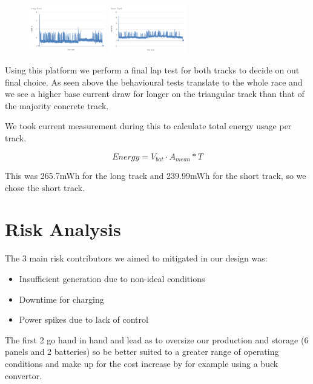\documentclass[11pt]{article}
\begin{document}
\begin{figure}[h!]
    \begin{center}
        \includegraphics[width=0.3\textwidth]{inc/long_lap.png}
        \includegraphics[width=0.3\textwidth]{inc/short_lap.png}
    \end{center}
\end{figure}

Using this platform we perform a final lap test for both tracks to decide on out final choice. As seen above the behavioural tests translate to the whole race and we see a higher base current draw for longer on the triangular track than that of the majority concrete track.

We took current measurement during this to calculate total energy usage per track.

$$Energy = V_{bat}{\cdot}A_{mean}*T$$

This was 265.7mWh for the long track and 239.99mWh for the short track, so we chose the short track.

\newpage
\section{Risk Analysis}
The 3 main risk contributors we aimed to mitigated in our design was:
\begin{itemize}
    \item Insufficient generation due to non-ideal conditions
    \item Downtime for charging
    \item Power spikes due to lack of control
\end{itemize}

The first 2 go hand in hand and lead as to oversize our production and storage (6 panels and 2 batteries) so be better suited to a greater range of operating conditions and make up for the cost increase by for example using a buck convertor.
\end{document}
